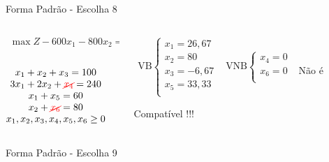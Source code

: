 \documentclass{beamer}
\begin{document}
\begin{frame}
{\begin{block}{Forma Padrão - {\color{cyan}Escolha 8}}
			\begin{columns}
				\begin{column}{0.35\textwidth}
					$
						\begin{matrix}
							\max Z - 600x_1 - 800x_2 = 0 \\
						\end{matrix}
					$ \\
					 \\
					$
						\begin{matrix}
							x_1  + x_2  + x_3                   = 100 \\
							3x_1 + 2x_2       + {\color{red}\cancel{x_4}}             = 240 \\
							x_1                     + x_5       = 60 \\
							x_2                           + {\color{red}\cancel{x_6}} = 80 \\
							x_1,x_2, x_3, x_4, x_5, x_6 \ge 0 \\
						\end{matrix}
					$
				\end{column}
				\vline
				\hspace{0.1cm}
				\begin{column}{0.55\textwidth}
						$
							\begin{matrix}
								\text{VB} \left\{  \begin{matrix}
																 x_1 = 26,67 \\
																 x_2 = 80 \\
																 x_3 = -6,67 \\
																 x_5 = 33,33 \\
												   \end{matrix} 
										   \right.
								&
								\text{VNB} \left\{  \begin{matrix}
																 x_4 = 0 \\
																 x_6 = 0 \\
												   \end{matrix} 
										   \right. 
								\\
							 & \\
							\end{matrix}
						$
						{\color{red}Não é Compatível !!!}
				\end{column}
			\end{columns}
		\end{block}
	}
	{
		\begin{block}{Forma Padrão - {\color{cyan}Escolha 9}}

\end{block}}
\end{frame}
\end{document}
